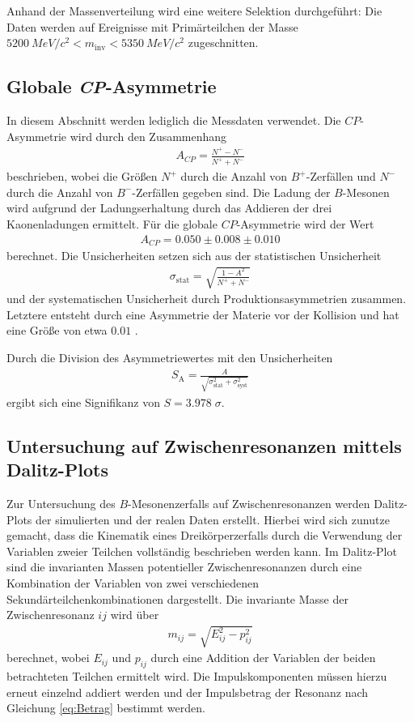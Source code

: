 Anhand der Massenverteilung wird eine weitere Selektion durchgeführt: Die Daten werden auf Ereignisse mit Primärteilchen der Masse $\SI{5200}{MeV/c^2} < m_{\mathrm{inv}} < \SI{5350}{MeV/c^2} $ zugeschnitten.

\subsection{Globale \textit{CP}-Asymmetrie}
\label{globAsymm}
In diesem Abschnitt werden lediglich die Messdaten verwendet.
Die $CP$-Asymmetrie wird durch den Zusammenhang
\begin{align}
  A_{CP}= \frac{N^{+} - N^{-}}{N^{+} + N^{-}}
  \label{eq:Asymm}
\end{align}
beschrieben, wobei die Größen $N^{+}$ durch die Anzahl von $B^{+}$-Zerfällen und $N^{-}$ durch die Anzahl von $B^{-}$-Zerfällen gegeben sind.
Die Ladung der $B$-Mesonen wird aufgrund der Ladungserhaltung durch das Addieren der drei Kaonenladungen ermittelt. Für die globale $CP$-Asymmetrie wird der Wert
\begin{align*}
  A_{CP} = 0.050 \pm 0.008 \pm 0.010
\end{align*}
berechnet. Die Unsicherheiten setzen sich aus der statistischen Unsicherheit
\begin{align}
  \sigma_{\mathrm{stat}} = \sqrt{\frac{1-A^2}{N^{+} + N^{-}}}
  \label{eq:sigma}
\end{align}
und der systematischen Unsicherheit durch Produktionsasymmetrien zusammen. Letztere entsteht durch eine Asymmetrie der Materie vor der Kollision und hat eine Größe von etwa  $0.01$ \cite{anleitung}.

Durch die Division des Asymmetriewertes mit den Unsicherheiten
\begin{align}
  S_{\mathrm{A}} = \frac{A}{\sqrt{\sigma_{\mathrm{stat}}^2 + \sigma_{\mathrm{syst}}^2}}
  \label{eq:Signifikanz}
\end{align}
ergibt sich eine Signifikanz von $S = 3.978\;\sigma$.

\subsection{Untersuchung auf Zwischenresonanzen mittels Dalitz-Plots}
Zur Untersuchung des $B$-Mesonenzerfalls auf Zwischenresonanzen werden Dalitz-Plots der simulierten und der realen Daten erstellt. Hierbei wird sich zunutze gemacht, dass die Kinematik eines Dreikörperzerfalls durch die Verwendung der Variablen zweier Teilchen vollständig beschrieben werden kann. Im Dalitz-Plot sind die invarianten Massen potentieller Zwischenresonanzen durch eine Kombination der Variablen von zwei verschiedenen Sekundärteilchenkombinationen dargestellt. Die invariante Masse der Zwischenresonanz $ij$ wird über
\begin{align}
  m_{ij} = \sqrt{ E_{ij}^2 - p_{ij}^2}
\end{align}
berechnet, wobei $ E_{ij}$ und $ p_{ij}$ durch eine Addition der Variablen der beiden betrachteten Teilchen ermittelt wird. Die Impulskomponenten müssen hierzu erneut einzelnd addiert werden und der Impulsbetrag der Resonanz nach Gleichung \eqref{eq:Betrag} bestimmt werden.

